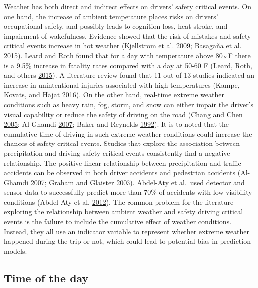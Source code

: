\documentclass[12pt]{book}
\numberwithin{equation}{chapter}
\begin{document}
Weather has both direct and indirect effects on drivers' safety critical events. On one hand, the increase of ambient temperature places risks on drivers' occupational safety, and possibly leads to cognition loss, heat stroke, and impairment of wakefulness. Evidence showed that the risk of mistakes and safety critical events increase in hot weather (Kjellstrom et al. \protect\hyperlink{ref-kjellstrom2009direct}{2009}; Basagaña et al. \protect\hyperlink{ref-basagana2015high}{2015}). Leard and Roth found that for a day with temperature above 80◦F there is a 9.5\% increase in fatality rates compared with a day at 50-60 F (Leard, Roth, and others \protect\hyperlink{ref-leard2015weather}{2015}). A literature review found that 11 out of 13 studies indicated an increase in unintentional injuries associated with high temperatures (Kampe, Kovats, and Hajat \protect\hyperlink{ref-im2016impact}{2016}). On the other hand, real-time extreme weather conditions such as heavy rain, fog, storm, and snow can either impair the driver's visual capability or reduce the safety of driving on the road (Chang and Chen \protect\hyperlink{ref-chang2005data}{2005}; Al-Ghamdi \protect\hyperlink{ref-al2007experimental}{2007}; Baker and Reynolds \protect\hyperlink{ref-baker1992wind}{1992}). It is to noted that the cumulative time of driving in such extreme weather conditions could increase the chances of safety critical events. Studies that explore the association between precipitation and driving safety critical events consistently find a negative relationship. The positive linear relationship between precipitation and traffic accidents can be observed in both driver accidents and pedestrian accidents (Al-Ghamdi \protect\hyperlink{ref-al2007experimental}{2007}; Graham and Glaister \protect\hyperlink{ref-graham2003spatial}{2003}). Abdel-Aty et al.~used detector and sensor data to successfully predict more than 70\% of accidents with low visibility conditions (Abdel-Aty et al. \protect\hyperlink{ref-abdel2012real}{2012}). The common problem for the literature exploring the relationship between ambient weather and safety driving critical events is the failure to include the cumulative effect of weather conditions. Instead, they all use an indicator variable to represent whether extreme weather happened during the trip or not, which could lead to potential bias in prediction models.

\hypertarget{time-of-the-day}{%
\subsection{Time of the day}\label{time-of-the-day}}
\end{document}
